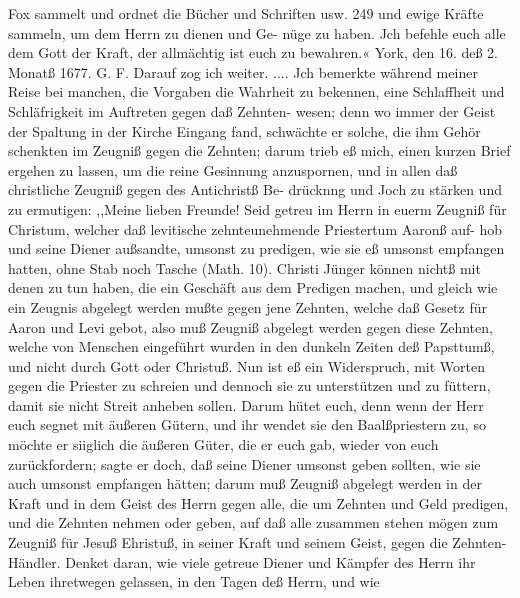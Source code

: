 Fox sammelt und ordnet die Bücher und Schriften usw. 249
und ewige Kräfte sammeln, um dem Herrn zu dienen und Ge-
nüge zu haben. Jch befehle euch alle dem Gott der Kraft, der
allmächtig ist euch zu bewahren.«
York, den 16. deß 2. Monatß 1677. G. F.
Darauf zog ich weiter. .... Jch bemerkte während meiner
Reise bei manchen, die Vorgaben die Wahrheit zu bekennen, eine
Schlaffheit und Schläfrigkeit im Auftreten gegen daß Zehnten-
wesen; denn wo immer der Geist der Spaltung in der Kirche
Eingang fand, schwächte er solche, die ihm Gehör schenkten
im Zeugniß gegen die Zehnten; darum trieb eß mich, einen kurzen
Brief ergehen zu lassen, um die reine Gesinnung anzuspornen,
und in allen daß christliche Zeugniß gegen des Antichristß Be-
drücknng und Joch zu stärken und zu ermutigen:
,,Meine lieben Freunde!
Seid getreu im Herrn in euerm Zeugniß für Christum,
welcher daß levitische zehnteunehmende Priestertum Aaronß auf-
hob und seine Diener außsandte, umsonst zu predigen, wie sie eß
umsonst empfangen hatten, ohne Stab noch Tasche (Math. 10).
Christi Jünger können nichtß mit denen zu tun haben, die ein
Geschäft aus dem Predigen machen, und gleich wie ein Zeugnis
abgelegt werden mußte gegen jene Zehnten, welche daß Gesetz
für Aaron und Levi gebot, also muß Zeugniß abgelegt werden
gegen diese Zehnten, welche von Menschen eingeführt wurden in
den dunkeln Zeiten deß Papsttumß, und nicht durch Gott oder
Christuß. Nun ist eß ein Widerspruch, mit Worten gegen die
Priester zu schreien und dennoch sie zu unterstützen und zu
füttern, damit sie nicht Streit anheben sollen. Darum hütet euch,
denn wenn der Herr euch segnet mit äußeren Gütern, und ihr
wendet sie den Baalßpriestern zu, so möchte er siiglich die
äußeren Güter, die er euch gab, wieder von euch zurückfordern; sagte
er doch, daß seine Diener umsonst geben sollten, wie sie auch umsonst
empfangen hätten; darum muß Zeugniß abgelegt werden in der
Kraft und in dem Geist des Herrn gegen alle, die um Zehnten
und Geld predigen, und die Zehnten nehmen oder geben, auf
daß alle zusammen stehen mögen zum Zeugniß für Jesuß Ehristuß,
in seiner Kraft und seinem Geist, gegen die Zehnten-Händler.
Denket daran, wie viele getreue Diener und Kämpfer des Herrn
ihr Leben ihretwegen gelassen, in den Tagen deß Herrn, und wie

